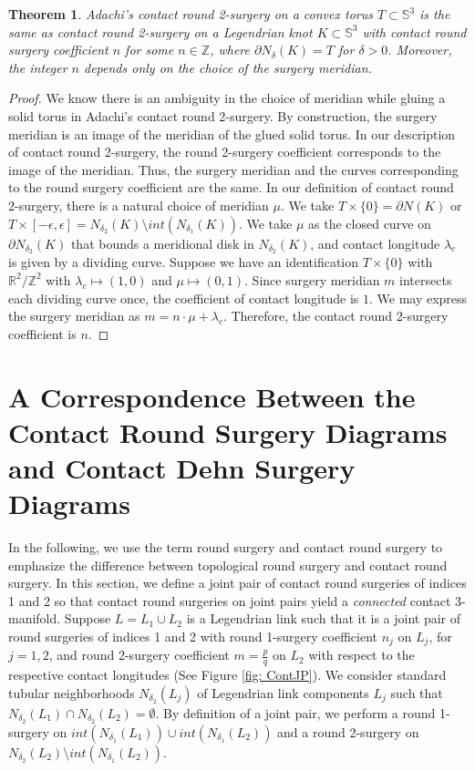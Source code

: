 \documentclass{amsart}
\theoremstyle{plain}
\newtheorem{thm}{Theorem}
\theoremstyle{remark}
\theoremstyle{definition}
\newcommand{\s}{\mathbb{S}}
\newcommand{\dd}{\partial}
\begin{document}
\begin{thm}\label{thm: JCR2SasCR2S}
Adachi's contact round 2-surgery on a convex torus $T\subset \mathbb{S}^3$ is the same as contact round 2-surgery on a Legendrian knot $K \subset \s^3$ with contact round surgery coefficient $n$ for some $n\in \mathbb{Z}$, where $\dd N_{\delta}(K)= T$ for  $\delta>0$.   Moreover, the integer $n$ depends only on the choice of the surgery meridian.   
\end{thm}

\begin{proof}
We know there is an ambiguity in the choice of meridian while gluing a solid torus in Adachi's contact round 2-surgery. 
By construction, the surgery meridian is an image of the meridian of the glued solid torus.
In our description of contact round 2-surgery, the round 2-surgery coefficient corresponds to the image of the meridian. 
Thus, the surgery meridian and the curves corresponding to the round surgery coefficient are the same.
In our definition of contact round 2-surgery, there is a natural choice of meridian $\mu$. 
We take $T\times \{0\}= \dd N(K)$ or $T\times [-\epsilon, \epsilon] = N_{\delta_2}(K) \setminus int(N_{\delta_1}(K))$.  
We take $\mu$ as the closed curve on $\dd N_{\delta_2} (K)$ that bounds a meridional disk in $N_{\delta_2}(K)$, and contact longitude $\lambda_c$ is given by a dividing curve. 
Suppose we have an identification $T\times \{0\}$ with $\mathbb{R}^2/\mathbb{Z}^2$ with $\lambda_c \mapsto (1,0)$ and $\mu \mapsto (0,1)$. 
Since surgery meridian $m$ intersects each dividing curve once, the coefficient of contact longitude is $1$. 
We may express the surgery meridian as $m = n \cdot \mu + \lambda_c$.
Therefore, the contact round 2-surgery coefficient is $n$.
\end{proof}


\section{A Correspondence Between the Contact Round Surgery Diagrams and Contact Dehn Surgery Diagrams}

In the following, we use the term round surgery and contact round surgery to emphasize the difference between topological round surgery and contact round surgery. 
In this section, we define a joint pair of contact round surgeries of indices 1 and 2 so that contact round surgeries on joint pairs yield a \emph{connected} contact 3-manifold.  
Suppose $L= L_{1} \cup L_{2}$ is a Legendrian link such that it is a joint pair of round surgeries of indices 1 and 2 with round 1-surgery coefficient $n_{j}$ on $L_{j}$, for $j=1, 2$, and round 2-surgery coefficient $m=\frac{p}{q}$ on $L_{2}$ with respect to the respective contact longitudes (See Figure \ref{fig: ContJP}).
We consider standard tubular neighborhoods $N_{\delta_2}(L_{j})$ of Legendrian link components $L_{j}$ such that $N_{\delta_2}(L_{1})\cap N_{\delta_2}(L_{2})=\emptyset$. By definition of a joint pair, we perform a round 1-surgery on $int(N_{\delta_1}(L_{1}))\cup int(N_{\delta_1}(L_{2}))$ and a round 2-surgery on $N_{\delta_2}(L_{2})\setminus int(N_{\delta_1}(L_{2}))$. 
\end{document}
